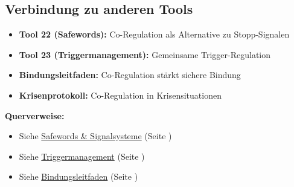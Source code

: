 
\subsection{Verbindung zu anderen Tools}

\begin{itemize}
  \item \textbf{Tool 22 (Safewords):} Co-Regulation als Alternative zu Stopp-Signalen
  \item \textbf{Tool 23 (Triggermanagement):} Gemeinsame Trigger-Regulation
  \item \textbf{Bindungsleitfaden:} Co-Regulation stärkt sichere Bindung
  \item \textbf{Krisenprotokoll:} Co-Regulation in Krisensituationen
\end{itemize}

\textbf{Querverweise:}
\begin{itemize}
  \item Siehe \hyperref[sec:safewords]{Safewords \& Signalsysteme} (Seite \pageref{sec:safewords})
  \item Siehe \hyperref[sec:triggermanagement]{Triggermanagement} (Seite \pageref{sec:triggermanagement})
  \item Siehe \hyperref[sec:bindung]{Bindungsleitfaden} (Seite \pageref{sec:bindung})
\end{itemize}

\newpage
